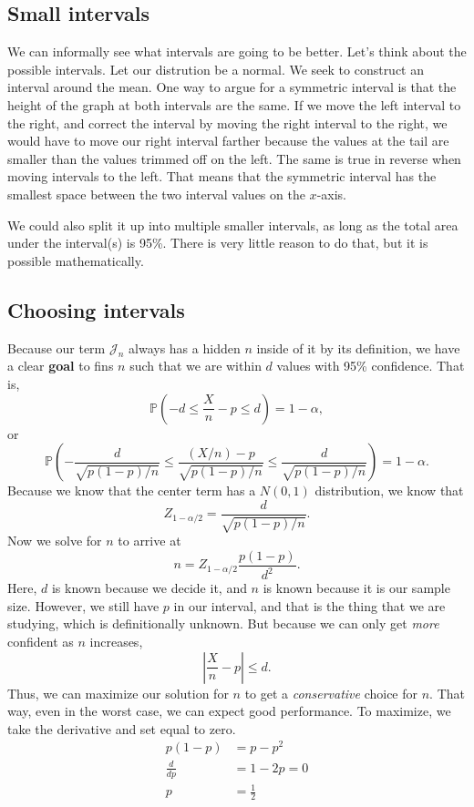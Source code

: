 \documentclass[titlepage, 12pt, leqno]{article}
\begin{document}
\subsection{Small intervals}
We can informally see what intervals are going to be better. Let's think about
the possible intervals. Let our distrution be a normal. We seek to construct an
interval around the mean. One way to argue for a symmetric interval is that the
height of the graph at both intervals are the same. If we move the left interval
to the right, and correct the interval by moving the right interval to the right,
we would have to move our right interval farther because the values at the tail 
are smaller than the values trimmed off on the left. The same is true in
reverse when moving intervals to the left. That means that the symmetric 
interval has the smallest space between the two interval values on the $x$-axis.

We could also split it up into multiple smaller intervals, as long as the total
area under the interval(s) is 95\%. There is very little reason to do that, but
it is possible mathematically. 

\subsection{Choosing intervals}
Because our term $\mathcal{J}_{n}$ always has a hidden $n$ inside of it by its
definition, we have a clear \textbf{goal} to fins $n$ such that we are within
$d$ values with 95\% confidence. That is,
\[
\mathbb{P}(-d \le \frac{X}{n} - p \le d) = 1- \alpha,
\]
or
\[
\mathbb{P}\left(-\frac{d}{\sqrt{p(1-p)/n}} \le \frac{(X/n) - p}
    {\sqrt{p(1-p)/n}} \le \frac{d}{\sqrt{p(1-p)/n}}\right) = 1-\alpha.
\]
Because we know that the center term has a $N(0,1)$ distribution, we know that
\[
Z_{1-\alpha/2} = \frac{d}{\sqrt{p(1-p)/n}}.
\]
Now we solve for $n$ to arrive at
\[
    n = Z_{1-\alpha/2}\frac{p(1-p)}{d^{2}}.
\]
Here, $d$ is known because we decide it, and $n$ is known because it is our
sample size. However, we still have $p$ in our interval, and that is the thing
that we are studying, which is definitionally unknown. But because we can only
get \textit{more} confident as $n$ increases,
\[
\left| \frac{X}{n}-p \right| \le d.
\]
Thus, we can maximize our solution for $n$ to get a \textit{conservative}
choice for $n$. That way, even in the worst case, we can expect good performance.
To maximize, we take the derivative and set equal to zero.
\begin{align*}
    p(1-p)
    &= p - p^{2}\\
    \frac{d}{dp} &= 1 - 2p =0 \\
    p &= \frac{1}{2}
\end{align*}
\end{document}
